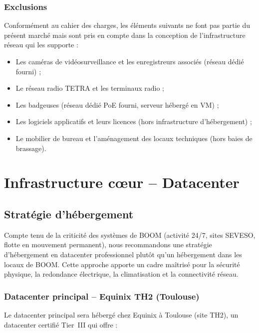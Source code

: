 \documentclass[12pt,a4paper]{report}
\begin{document}
\subsection{Exclusions}

Conformément au cahier des charges, les éléments suivants ne font pas partie du présent marché mais sont pris en compte dans la conception de l'infrastructure réseau qui les supporte :

\begin{itemize}
\item Les caméras de vidéosurveillance et les enregistreurs associés (réseau dédié fourni) ;
\item Le réseau radio TETRA et les terminaux radio ;
\item Les badgeuses (réseau dédié PoE fourni, serveur hébergé en VM) ;
\item Les logiciels applicatifs et leurs licences (hors infrastructure d'hébergement) ;
\item Le mobilier de bureau et l'aménagement des locaux techniques (hors baies de brassage).
\end{itemize}


\chapter{Infrastructure c\oe ur -- Datacenter}

\section{Stratégie d'hébergement}

Compte tenu de la criticité des systèmes de BOOM (activité 24/7, sites SEVESO, flotte en mouvement permanent), nous recommandons une stratégie d'hébergement en datacenter professionnel plutôt qu'un hébergement dans les locaux de BOOM. Cette approche apporte un cadre maîtrisé pour la sécurité physique, la redondance électrique, la climatisation et la connectivité réseau.

\subsection{Datacenter principal -- Equinix TH2 (Toulouse)}

Le datacenter principal sera hébergé chez Equinix à Toulouse (site TH2), un datacenter certifié Tier~III qui offre :
\end{document}
